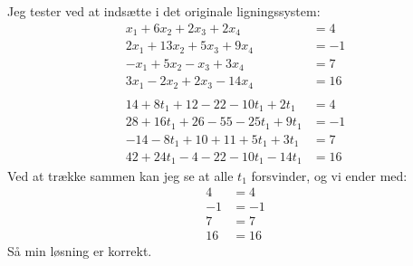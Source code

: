 Jeg tester ved at indsætte i det originale ligningssystem:
\begin{equation*}
\begin{split}
x_1 + 6x_2 + 2x_3 + 2x_4 	&= 4\\
2x_1 + 13x_2 + 5x_3 + 9x_4 	&= -1\\
-x_1 + 5x_2 - x_3 + 3x_4 	&= 7\\
3x_1 - 2x_2 + 2x_3 - 14x_4 	&= 16\\
\\
14 + 8t_1 + 12 - 22 - 10t_1 + 2t_1 		&= 4\\
28 + 16t_1 + 26 - 55 - 25t_1 + 9t_1 	&= -1\\
-14 - 8t_1 + 10 + 11 + 5t_1 + 3t_1 		&= 7\\
42 + 24t_1 - 4 - 22 - 10t_1 - 14t_1 	&= 16
\end{split}
\end{equation*}
Ved at trække sammen kan jeg se at alle $t_1$ forsvinder, og vi ender med:
\begin{equation*}
\begin{split}
4	&= 4\\
-1	&= -1\\
7	&= 7\\
16	&= 16
\end{split}
\end{equation*}
Så min løsning er korrekt.